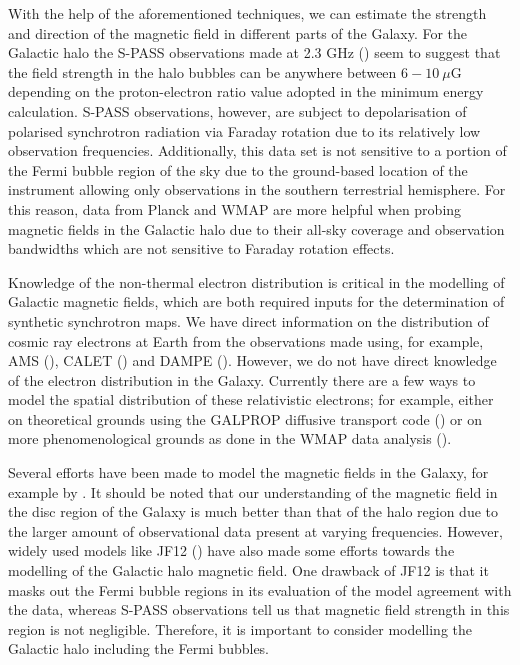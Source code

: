\documentclass[usenatbib]{mnras}
\begin{document}
With the help of the aforementioned techniques, we can estimate the strength and direction of the magnetic field in different parts of the Galaxy. 
For the Galactic halo the S-PASS observations made at 2.3 GHz (\cite{Carretti_2013}) seem to suggest that the field strength in the halo bubbles can be anywhere between $6-10~\mu $G depending on the proton-electron ratio value adopted in the minimum energy calculation. S-PASS observations, however, are subject to depolarisation of polarised synchrotron radiation via Faraday rotation due to its relatively low observation frequencies. Additionally, this data set is not sensitive to a portion of the Fermi bubble region of the sky due to the ground-based location of the instrument allowing only observations in the southern terrestrial hemisphere. For this reason, data from Planck and WMAP are more helpful when probing magnetic fields in the Galactic halo due to their all-sky coverage and observation bandwidths which are not sensitive to Faraday rotation effects.

Knowledge of the non-thermal electron distribution is critical in the modelling of Galactic magnetic fields, which are both required inputs for the determination of synthetic synchrotron maps.
We have direct information on the distribution of cosmic ray electrons at Earth from the observations made using, for example, AMS (\cite{AMS_2002, AMS_2014}), CALET (\cite{Calet_2017}) and DAMPE (\cite{Dampe_2017}). However, we do not have direct knowledge of the electron distribution in the Galaxy.
Currently there are a few ways to model the spatial distribution of these relativistic electrons; for example, either on theoretical grounds using the GALPROP diffusive transport code (\cite{Hammurabi, Orlando_2011}) or on more phenomenological grounds as done in the WMAP data analysis (\cite{WMAP_Page}).


Several efforts have been made to model the magnetic fields in the Galaxy, for example by \cite{Sun_2008, Jaffe_2010, Jaffe_2011, JF12}. It should be noted that our understanding of the magnetic field in the disc region of the Galaxy is much better than that of the halo region due to the larger amount of observational data present at varying frequencies. However, widely used models like JF12 (\cite{JF12}) have also made some efforts towards the modelling of the Galactic halo magnetic field. One drawback of JF12 is that it masks out the Fermi bubble regions in its evaluation of the model agreement with the data, whereas S-PASS  observations \citep{Carretti_2013} tell us that magnetic field strength in this region is not negligible. Therefore, it is important to consider modelling the Galactic halo including the Fermi bubbles.
\end{document}
